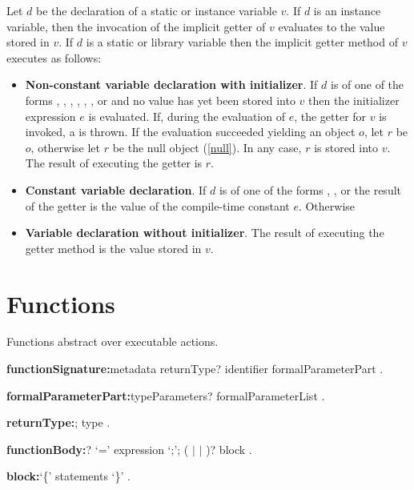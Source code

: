 \documentclass{article}
\begin{document}
\LMHash{}
Let $d$ be the declaration of a static or instance variable $v$.
If $d$ is an instance variable, then the invocation of the implicit getter of $v$ evaluates to the value stored in $v$.
If $d$ is a static or library variable then the implicit getter method of $v$ executes as follows:
\begin{itemize}
\item {\bf Non-constant variable declaration with initializer}.
If $d$ is of one of the forms , , , , , ,  or  and no value has yet been stored into $v$ then the initializer expression $e$ is evaluated.
If, during the evaluation of $e$, the getter for $v$ is invoked, a  is thrown.
If the evaluation succeeded yielding an object $o$, let $r$ be $o$, otherwise let $r$ be the null object (\ref{null}).
In any case, $r$ is stored into $v$.
The result of executing the getter is $r$.
\item {\bf Constant variable declaration}.
If $d$ is of one of the forms , ,  or  the result of the getter is the value of the compile-time constant $e$.
Otherwise
\item {\bf Variable declaration without initializer}.
The result of executing the getter method is the value stored in $v$.
\end{itemize}


\section{Functions}

\LMHash{}
Functions abstract over executable actions.

\begin{grammar}
{\bf functionSignature:}metadata returnType? identifier formalParameterPart
  .

{\bf formalParameterPart:}typeParameters? formalParameterList
  .

{\bf returnType:}\VOID{};
  type
  .

{\bf functionBody:}\ASYNC{}? `={\escapegrammar \gt}' expression `{\escapegrammar ;}';
  (\ASYNC{} $|$ \ASYNC* $|$ \SYNC*)? block
  .

{\bf block:}`\{' statements `\}'
  .
\end{grammar}
\end{document}
